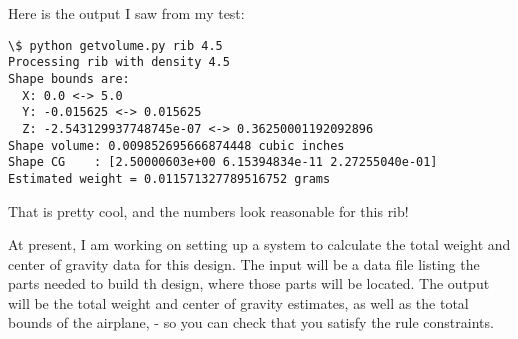 Here is the output I saw from my test:

\begin{lstlisting}
\$ python getvolume.py rib 4.5
Processing rib with density 4.5
Shape bounds are:
  X: 0.0 <-> 5.0
  Y: -0.015625 <-> 0.015625
  Z: -2.543129937748745e-07 <-> 0.36250001192092896
Shape volume: 0.009852695666874448 cubic inches
Shape CG    : [2.50000603e+00 6.15394834e-11 2.27255040e-01]
Estimated weight = 0.011571327789516752 grams
\end{lstlisting}

That is pretty cool, and the numbers look reasonable for this rib!

At present, I am working on setting up a system to calculate the total weight
and center of gravity data for this design. The input will be a data file
listing the parts needed to build th design, where those parts will be located.
The output will be the total weight and center of gravity estimates, as well as
the total bounds of the airplane, - so you can check that you satisfy the rule
constraints.

